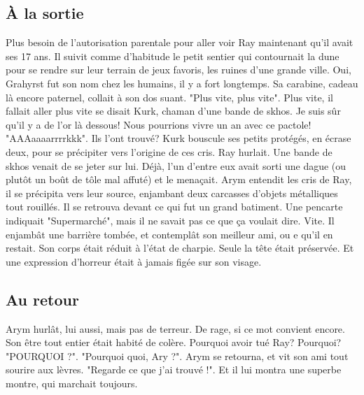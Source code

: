 \subsection{À la sortie}
Plus besoin de l'autorisation parentale pour aller voir Ray maintenant qu'il avait ses 17 ans. Il suivit comme d'habitude le petit sentier qui contournait la dune pour se rendre sur leur terrain de jeux favoris, les ruines d'une grande ville. Oui, Grahyrst fut son nom chez les humains, il y a fort longtemps. Sa carabine, cadeau là encore paternel, collait à son dos suant.
\newline
"Plus vite, plus vite". Plus vite, il fallait aller plus vite se disait Kurk, chaman d'une bande de skhos. Je suis sûr qu'il y a de l'or là dessous! Nous pourrions vivre un an avec ce pactole! "AAAaaaarrrrkkk". Ils l'ont trouvé? Kurk bouscule ses petits protégés, en écrase deux, pour se précipiter vers l'origine de ces cris.
\newline
Ray hurlait. Une bande de skhos venait de se jeter sur lui. Déjà, l'un d'entre eux avait sorti une dague (ou plutôt un boût de tôle mal affuté) et le menaçait.
\newline
Arym entendit les cris de Ray, il se précipita vers leur source, enjambant deux carcasses d'objets métalliques tout rouillés. Il se retrouva devant ce qui fut un grand batiment. Une pencarte indiquait "Supermarché", mais il ne savait pas ce que ça voulait dire. Vite. Il enjambât une barrière tombée, et contemplât son meilleur ami, ou e qu'il en restait. Son corps était réduit à l'état de charpie. Seule la tête était préservée. Et une expression d'horreur était à jamais figée sur son visage.
\subsection{Au retour}
Arym hurlât, lui aussi, mais pas de terreur. De rage, si ce mot convient encore. Son être tout entier était habité de colère. Pourquoi avoir tué Ray? Pourquoi? "POURQUOI ?". 
\newline
"Pourquoi quoi, Ary ?". Arym se retourna, et vit son ami tout sourire aux lèvres. "Regarde ce que j'ai trouvé !". Et il lui montra une superbe montre, qui marchait toujours. 